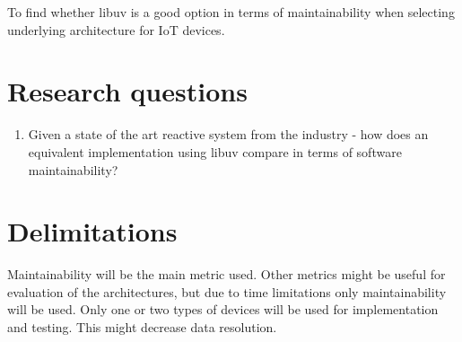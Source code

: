 To find whether libuv is a good option in terms of maintainability when
selecting underlying architecture for IoT devices.

\section{Research questions}
\label{sec:research-questions}

\begin{enumerate}

  \item Given a state of the art reactive system from the industry - how does
    an equivalent implementation using libuv compare in terms of software
    maintainability?

\end{enumerate}

\section{Delimitations}
\label{sec:delimitations}

Maintainability will be the main metric used. Other metrics might be useful for
evaluation of the architectures, but due to time limitations only
maintainability will be used. Only one or two types of devices will be used for
implementation and testing. This might decrease data resolution.
